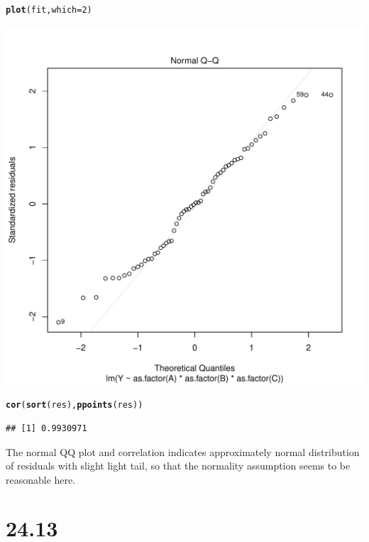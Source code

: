 \documentclass{article}\usepackage[]{graphicx}\usepackage[]{color}
\makeatletter
\def\maxwidth{ %
  \ifdim\Gin@nat@width>\linewidth
    \linewidth
  \else
    \Gin@nat@width
  \fi
}
\newcommand{\hlnum}[1]{\textcolor[rgb]{0.686,0.059,0.569}{#1}}%
\newcommand{\hlstd}[1]{\textcolor[rgb]{0.345,0.345,0.345}{#1}}%
\newcommand{\hlkwc}[1]{\textcolor[rgb]{0.333,0.667,0.333}{#1}}%
\newcommand{\hlkwd}[1]{\textcolor[rgb]{0.737,0.353,0.396}{\textbf{#1}}}%
\newenvironment{kframe}{%
 \def\at@end@of@kframe{}%
 \ifinner\ifhmode%
  \def\at@end@of@kframe{\end{minipage}}%
  \begin{minipage}{\columnwidth}%
 \fi\fi%
 \def\FrameCommand##1{\hskip\@totalleftmargin \hskip-\fboxsep
 \colorbox{shadecolor}{##1}\hskip-\fboxsep
     \hskip-\linewidth \hskip-\@totalleftmargin \hskip\columnwidth}%
 \MakeFramed {\advance\hsize-\width
   \@totalleftmargin\z@ \linewidth\hsize
   \@setminipage}}%
 {\par\unskip\endMakeFramed%
 \at@end@of@kframe}
\newenvironment{knitrout}{}{} %
\makeatother
\begin{document}
\begin{enumerate}[(a)]
\begin{knitrout}
\color{fgcolor}\begin{kframe}
\begin{alltt}
  \hlkwd{plot}\hlstd{(fit,} \hlkwc{which} \hlstd{=} \hlnum{2}\hlstd{)}
\end{alltt}
\end{kframe}
\includegraphics[width=\maxwidth]{figure/unnamed-chunk-2-1} 
\begin{kframe}\begin{alltt}
  \hlkwd{cor}\hlstd{(}\hlkwd{sort}\hlstd{(res),} \hlkwd{ppoints}\hlstd{(res))}
\end{alltt}
\begin{verbatim}
## [1] 0.9930971
\end{verbatim}
\end{kframe}
\end{knitrout}

\qquad The normal QQ plot and correlation indicates approximately normal distribution of residuals with slight light tail, so that the normality assumption seems to be reasonable here.

\end{enumerate}

\section{24.13}
\end{document}
